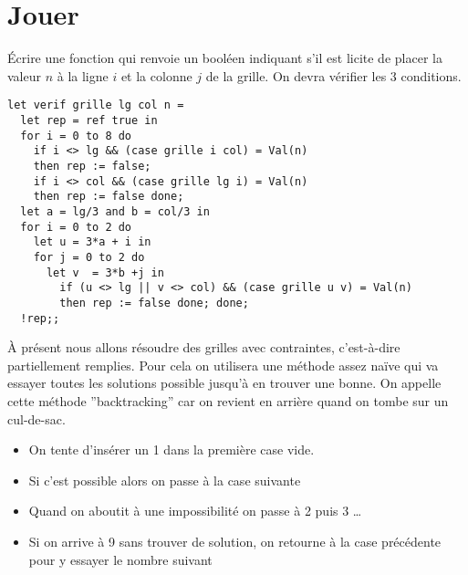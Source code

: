 \section{Jouer}
\begin{Exercise}\'Ecrire une fonction  qui renvoie un booléen indiquant s'il est licite de placer la valeur $n$ à la ligne $i$ et la colonne $j$ de la grille. On devra vérifier les 3 conditions.
\end{Exercise}
\begin{Answer}
\begin{lstlisting}
let verif grille lg col n =
  let rep = ref true in
  for i = 0 to 8 do
    if i <> lg && (case grille i col) = Val(n)
    then rep := false;
    if i <> col && (case grille lg i) = Val(n)
    then rep := false done;
  let a = lg/3 and b = col/3 in
  for i = 0 to 2 do
    let u = 3*a + i in
    for j = 0 to 2 do 
      let v  = 3*b +j in
        if (u <> lg || v <> col) && (case grille u v) = Val(n)
        then rep := false done; done;
  !rep;;
\end{lstlisting} 
\end{Answer}
\`A présent nous allons résoudre des grilles avec contraintes, c'est-à-dire partiellement remplies. Pour cela on utilisera une méthode assez naïve qui va essayer toutes les solutions possible jusqu'à en trouver une bonne. On appelle cette méthode ''backtracking'' car on revient en arrière quand on tombe sur un cul-de-sac.
\begin{itemize}
\item On tente d'insérer un 1 dans la première case vide.
\item Si c'est possible alors on passe à la case suivante
\item Quand on aboutit à une impossibilité on passe à 2 puis 3 \dots
\item Si on arrive à 9 sans trouver de solution, on retourne à la case précédente pour y essayer le nombre suivant
\end{itemize}
